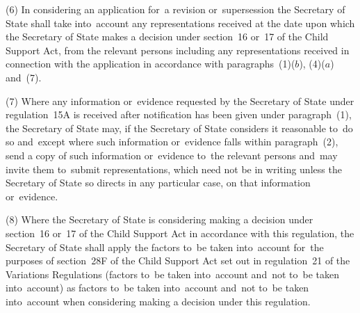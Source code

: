 \documentclass[12pt,a4paper]{article}
\begin{document}
(6) In considering an application for~a revision or~supersession the 
Secretary of State  %
shall take into~account any representations received at the date upon which 
the Secretary of State  %
makes a decision under section~16 or~17 of the Child Support Act, from the relevant persons including any representations received in connection with the application in accordance with paragraphs~(1)($b$), (4)($a$)  and~(7).

(7) Where any information or~evidence requested by the 
Secretary of State  %
under regulation~15A is received after notification has been given under paragraph~(1), 
the Secretary of State  %
may, if 
the Secretary of State  %
considers it reasonable to~do so and~except where such information or~evidence falls within paragraph~(2), send a copy of such information or~evidence to~the relevant persons and~may invite them to~submit representations, which need not be in writing unless the 
Secretary of State  %
so directs in any particular case, on that information or~evidence.

(8) Where the 
Secretary of State  %
is considering making a decision under section~16 or~17 of the Child Support Act in accordance with this regulation, 
the Secretary of State  %
shall apply the factors to~be taken into~account for~the purposes of section~28F of the Child Support Act set out in regulation~21 of the Variations Regulations (factors to~be taken into~account and~not to~be taken into~account) as factors to~be taken into~account and~not to~be taken into~account when considering making a decision under this regulation.
\end{document}
